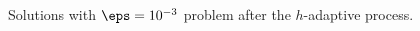 \begin{frame}
\begin{figure}
\begin{tikzpicture}[scale=0.85]
  \end{tikzpicture}
  \caption{Solutions with $\eps=10^{-3}$ problem after the $h$-adaptive process.}
\end{figure}

\end{frame}